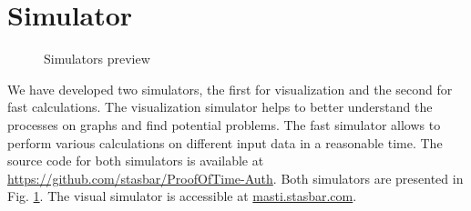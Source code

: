\section{Simulator}
\label{simulator}
\begin{figure}[h!]
 \hfill 	
\caption{Simulators preview}
\label{fig:simulators}
\end{figure}
We have developed two simulators, the first for visualization and the second for fast calculations. The visualization simulator helps to better understand the processes on graphs and find potential problems. The fast simulator allows to perform various calculations on different input data in a reasonable time. The source code for both simulators is available at \url{https://github.com/stasbar/ProofOfTime-Auth}. Both simulators are presented in Fig. \ref{fig:simulators}. The visual simulator is accessible at \url{masti.stasbar.com}.
